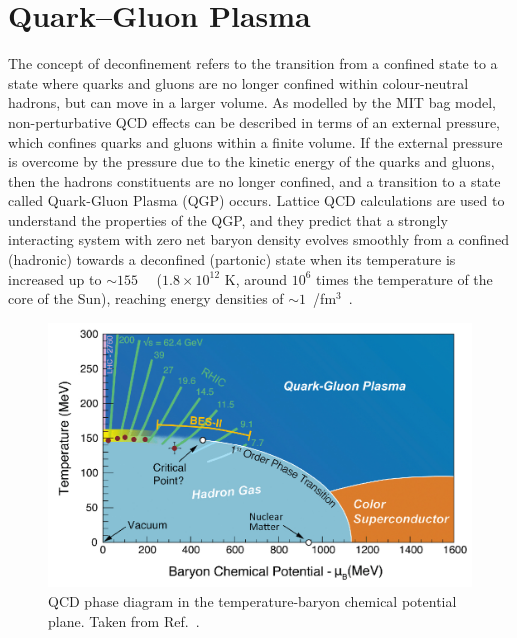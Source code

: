 \section{Quark--Gluon Plasma}
The concept of deconfinement refers to the transition from a confined state to a state where quarks and gluons are no longer confined within colour-neutral hadrons, but can move in a larger volume. As modelled by the MIT bag model, non-perturbative QCD effects can be described in terms of an external pressure, which confines quarks and gluons within a finite volume. If the external pressure is overcome by the pressure due to the kinetic energy of the quarks and gluons, then the hadrons constituents are no longer confined, and a transition to a state called Quark-Gluon Plasma (QGP) occurs. Lattice QCD calculations are used to understand the properties of the QGP, and they predict that a strongly interacting system with zero net baryon density evolves smoothly from a confined (hadronic) towards a deconfined (partonic) state when its temperature is increased up to $\sim155$~\mev~\cite{HotQCD:2014kol, Borsanyi:2013bia} ($1.8\times 10^{12}$ K, around $10^6$ times the temperature of the core of the Sun), reaching energy densities of $\sim 1$~\gev/fm$^3$~\cite{Bazavov:2017dus}.

\begin{figure}
  \centering
  \includegraphics[width=0.7\linewidth]{Figures/Chapter 1/QCD-diagram.jpg}
  \caption{QCD phase diagram in the temperature-baryon chemical potential plane. Taken from Ref.~\cite{QCD_diagram}.}
  \label{fig:PhaseDiagram}
\end{figure}

